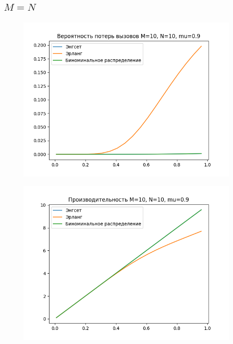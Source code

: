 \documentclass[12pt]{article}
\begin{document}
\subsection{$M = N$}\label{subsec:}

\begin{figure}[!htb]
\centering
\includegraphics[scale=1.00]{loss_prob_M10_N10_mu09.png}
\caption{}
\label{}
\end{figure}

\begin{figure}[!htb]
\centering
\includegraphics[scale=1.00]{perf_M10_N10_mu09.png}
\caption{}
\label{}
\end{figure}
\end{document}
